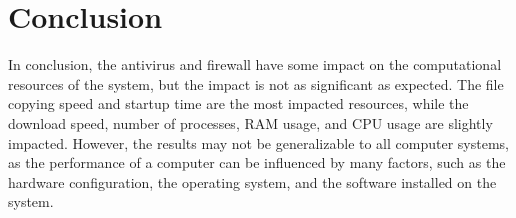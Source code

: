 \documentclass[runningheads,a4paper,english]{llncs}[2022/01/12]
\begin{document}
\section{Conclusion}
\label{sec:conclusion}

\par In conclusion, the antivirus and firewall have some impact on the
computational resources of the system, but the impact is not as significant as
expected. The file copying speed and startup time are the most impacted
resources, while the download speed, number of processes, RAM usage, and CPU
usage are slightly impacted. However, the results may not be generalizable to
all computer systems, as the performance of a computer can be influenced by
many factors, such as the hardware configuration, the operating system, and the
software installed on the system.





\end{document}
